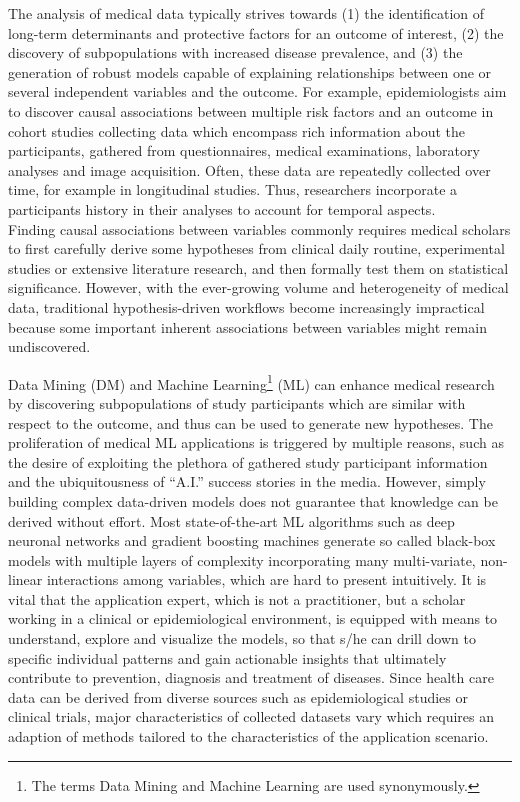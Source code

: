 \documentclass[
]{book}
\begin{document}
The analysis of medical data typically strives towards (1) the identification of long-term determinants and protective factors for an outcome of interest, (2) the discovery of subpopulations with increased disease prevalence, and (3) the generation of robust models capable of explaining relationships between one or several independent variables and the outcome.
For example, epidemiologists aim to discover causal associations between multiple risk factors and an outcome in cohort studies collecting data which encompass rich information about the participants, gathered from questionnaires, medical examinations, laboratory analyses and image acquisition.
Often, these data are repeatedly collected over time, for example in longitudinal studies. Thus, researchers incorporate a participants history in their analyses to account for temporal aspects.\\
Finding causal associations between variables commonly requires medical scholars to first carefully derive some hypotheses from clinical daily routine, experimental studies or extensive literature research, and then formally test them on statistical significance.
However, with the ever-growing volume and heterogeneity of medical data, traditional hypothesis-driven workflows become increasingly impractical because some important inherent associations between variables might remain undiscovered.

Data Mining (DM) and Machine Learning\footnote{The terms Data Mining and Machine Learning are used synonymously.} (ML) can enhance medical research by discovering subpopulations of study participants which are similar with respect to the outcome, and thus can be used to generate new hypotheses.
The proliferation of medical ML applications is triggered by multiple reasons, such as the desire of exploiting the plethora of gathered study participant information and the ubiquitousness of ``A.I.'' success stories in the media.
However, simply building complex data-driven models does not guarantee that knowledge can be derived without effort.
Most state-of-the-art ML algorithms such as deep neuronal networks and gradient boosting machines generate so called black-box models with multiple layers of complexity incorporating many multi-variate, non-linear interactions among variables, which are hard to present intuitively.
It is vital that the application expert, which is not a practitioner, but a scholar working in a clinical or epidemiological environment, is equipped with means to understand, explore and visualize the models, so that s/he can drill down to specific individual patterns and gain actionable insights that ultimately contribute to prevention, diagnosis and treatment of diseases.
Since health care data can be derived from diverse sources such as epidemiological studies or clinical trials, major characteristics of collected datasets vary which requires an adaption of methods tailored to the characteristics of the application scenario.
\end{document}
